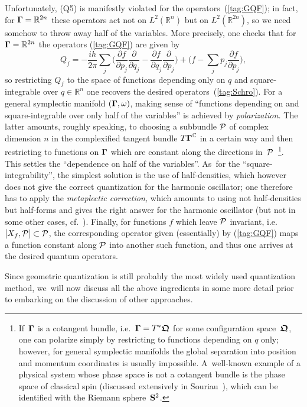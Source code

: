 \documentclass[12pt]{amsart}
\numberwithin{equation}{section}
\theoremstyle{remark}
\newcommand\Omg{{\bigam}}   %
\newcommand\PP{{\Cal P}}
\newcommand\RR{\mathbb R}
\newcommand{\CC}{\C}
\newcommand{\bigam}{\mbox{\boldmath $\Gamma$}}
\newcommand{\bfrakQ}{\mbox{\boldmath $\mathfrak Q$}}
\newcommand{\C}{\mathbb C}
\begin{document}
Unfortunately, (Q5) is manifestly violated for the operators~(\ref{tag:GQF});
in fact, for $\Omg=\RR^{2n}$ these operators act not on $L^2(\RR^n)$ but on
$L^2(\RR^{2n})$, so we need somehow to throw away half of the variables. More
precisely, one checks that for $\Omg=\RR^{2n}$ the operators (\ref{tag:GQF})
are given by
$$ Q_f = -\frac{ih}{2\pi} \sum_j \bigg(
\frac{\partial f}{\partial p_j} \frac\partial{\partial q_j} -
\frac{\partial f}{\partial q_j} \frac\partial{\partial p_j} \bigg)
+ \bigg(f-\sum_j p_j \frac{\partial f}{\partial p_j} \bigg) ,  $$
so restricting $Q_f$ to the space of functions depending only on $q$ and
square-integrable over $q\in\RR^n$ one recovers the desired
operators~(\ref{tag:Schro}). For a general symplectic manifold $(\Omg,\omega)$,
making sense of ``functions depending on and square-integrable over only half
of the variables'' is achieved by {\it polarization.\/} The latter amounts,
roughly speaking, to choosing a subbundle $\PP$ of complex dimension $n$ in the
complexified tangent bundle $T\Omg^\CC$ in a certain way and then restricting
to functions on $\Omg$ which are constant along the directions
in~$\PP$~\footnote{If~$\Omg$ is a cotangent bundle, i.e.~$\Omg=T^*\bfrakQ$ for
some configuration space~$\bfrakQ$, one can polarize simply by restricting to
functions depending on $q$ only; however, for general symplectic manifolds the
global separation into position and momentum coordinates is usually impossible.
A~well-known example of a physical system whose phase space is not a cotangent
bundle is the phase space of classical spin (discussed extensively in
Souriau~\cite{bib:SouSD}),
which can be identified with the Riemann sphere~$\bold S^2$.}. This settles the
``dependence on half of the variables''. As~for the ``square-integrability'',
the simplest solution is the use of half-densities, which however does not give
the correct quantization for the harmonic oscillator; one therefore has to
apply the {\it metaplectic correction,\/} which amounts to using not
half-densities but half-forms
and gives the right answer for the
harmonic oscillator (but not in some other cases, cf.~\cite{bib:TuyWis}).
Finally, for functions $f$ which leave $\PP$ invariant, i.e.~$[X_f,\PP]\subset
\PP$, the corresponding operator given (essentially) by (\ref{tag:GQF}) maps a
function constant along $\PP$ into another such function, and thus one arrives
at the desired quantum operators.

Since geometric quantization is still probably the most widely used
quantization method, we~will now discuss all the above ingredients in some
more detail prior to embarking on the discussion of other approaches.
\end{document}
